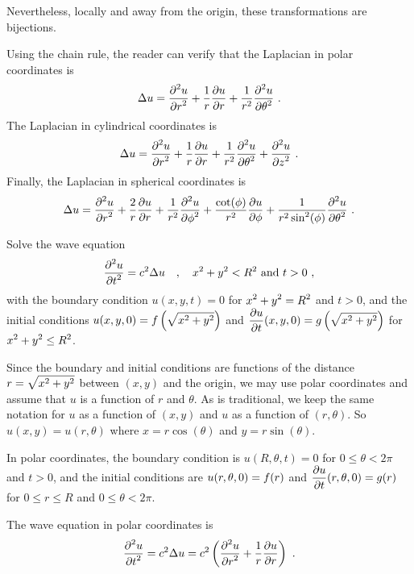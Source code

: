 Nevertheless, locally and away from the origin, these transformations
are bijections.

Using the chain rule, the reader can verify that the Laplacian in
polar coordinates is
\[
\Delta u = \frac{\displaystyle \partial^{2}{u}} {\displaystyle \partial r^{2}} + \frac{1}{r} \frac{\partial{u}}{\partial r}
+ \frac{1}{r^2} \frac{\displaystyle \partial^{2}{u}} {\displaystyle \partial \theta^{2}} \ .
\]
The Laplacian in cylindrical coordinates is
\[
\Delta u = \frac{\displaystyle \partial^{2}{u}} {\displaystyle \partial r^{2}} + \frac{1}{r} \frac{\partial{u}}{\partial r}
+ \frac{1}{r^2} \frac{\displaystyle \partial^{2}{u}} {\displaystyle \partial \theta^{2}} + \frac{\displaystyle \partial^{2}{u}} {\displaystyle \partial z^{2}} \ .
\]
Finally, the Laplacian in spherical coordinates is
\[
\Delta u = \frac{\displaystyle \partial^{2}{u}} {\displaystyle \partial r^{2}} + \frac{2}{r} \frac{\partial{u}}{\partial r}
+ \frac{1}{r^2} \frac{\displaystyle \partial^{2}{u}} {\displaystyle \partial \phi^{2}} + \frac{\cot(\phi)}{r^2}
\frac{\partial{u}}{\partial \phi} + \frac{1}{r^2\sin^2(\phi)}
\frac{\displaystyle \partial^{2}{u}} {\displaystyle \partial \theta^{2}} \ .
\]

\begin{egg}
Solve the wave equation
\[
\frac{\displaystyle \partial^{2}{u}} {\displaystyle \partial t^{2}} = c^2 \Delta u \quad , \quad x^2 + y^2  < R^2
\ \text{and} \ t > 0 \ , 
\]
with the boundary condition $u(x,y,t)=0$ for
$\displaystyle x^2 + y^2 = R^2$ and $t>0$, and the initial conditions
$\displaystyle u(x,y, 0) = f\left(\sqrt{x^2+y^2}\right)$ and
$\displaystyle \frac{\partial{u}}{\partial t}(x,y,0) = g\left(\sqrt{x^2+y^2}\right)$ for
$\displaystyle x^2 + y^2 \leq R^2$.

Since the boundary and initial conditions are functions of
the distance $\displaystyle r = \sqrt{x^2+y^2}$ between $(x,y)$ and
the origin, we may use polar coordinates and assume that $u$ is a
function of $r$ and $\theta$.  As is traditional, we keep the same
notation for $u$ as a function of $(x,y)$ and $u$ as a function of
$(r,\theta)$.
So $u(x,y) = u(r,\theta)$ where $x = r\cos(\theta)$ and $y = r\sin(\theta)$.

In polar coordinates, the boundary condition is
$u(R,\theta,t)=0$ for $0 \leq \theta < 2\pi$ and $t >0$, and the
initial conditions are $\displaystyle u(r,\theta, 0) = f(r)$ and
$\displaystyle \frac{\partial{u}}{\partial t}(r,\theta,0) = g(r)$ for
$0 \leq r \leq R$ and $0\leq \theta < 2\pi$.

The wave equation in polar coordinates is
\begin{equation} \label{wave_spv_we_pc}
\pdydxn{u}{t}{2} = c^2 \Delta u =
c^2 \left( \pdydxn{u}{r}{2} + \frac{1}{r} \pdydx{u}{r}\right) \ .
\end{equation}


\end{egg}
